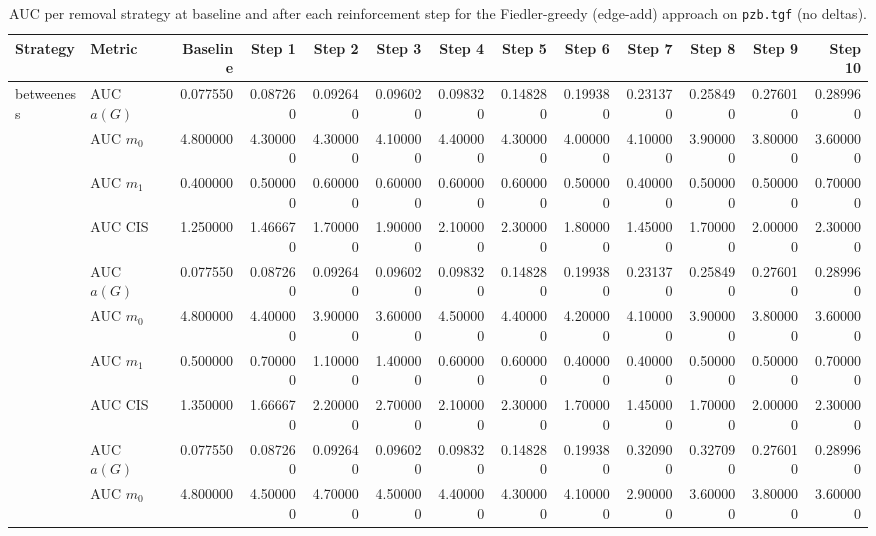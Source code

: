 \begin{table}[htbp]
  \centering
  \caption{AUC per removal strategy at baseline and after each reinforcement step for the Fiedler-greedy (edge-add) approach on \texttt{pzb.tgf} (no deltas).}
  \label{tab:pzb-fiedler_greedy-auc}
\setlength{\tabcolsep}{2.5pt}
  \begin{tabular}{llrrrrrrrrrrr}
    \toprule
    \textbf{Strategy} & \textbf{Metric} & \textbf{Baseline} & \textbf{Step 1} & \textbf{Step 2} & \textbf{Step 3} & \textbf{Step 4} & \textbf{Step 5} & \textbf{Step 6} & \textbf{Step 7} & \textbf{Step 8} & \textbf{Step 9} & \textbf{Step 10} \\
    \midrule
    \multirow{4}{*}{betweeness} & AUC $a(G)$ & 0.077550 & 0.087260 & 0.092640 & 0.096020 & 0.098320 & 0.148280 & 0.199380 & 0.231370 & 0.258490 & 0.276010 & 0.289960 \\
    & AUC $m_0$ & 4.800000 & 4.300000 & 4.300000 & 4.100000 & 4.400000 & 4.300000 & 4.000000 & 4.100000 & 3.900000 & 3.800000 & 3.600000 \\
    & AUC $m_1$ & 0.400000 & 0.500000 & 0.600000 & 0.600000 & 0.600000 & 0.600000 & 0.500000 & 0.400000 & 0.500000 & 0.500000 & 0.700000 \\
    & AUC CIS & 1.250000 & 1.466670 & 1.700000 & 1.900000 & 2.100000 & 2.300000 & 1.800000 & 1.450000 & 1.700000 & 2.000000 & 2.300000 \\
    \addlinespace
    \multirow{4}{*}{closeness} & AUC $a(G)$ & 0.077550 & 0.087260 & 0.092640 & 0.096020 & 0.098320 & 0.148280 & 0.199380 & 0.231370 & 0.258490 & 0.276010 & 0.289960 \\
    & AUC $m_0$ & 4.800000 & 4.400000 & 3.900000 & 3.600000 & 4.500000 & 4.400000 & 4.200000 & 4.100000 & 3.900000 & 3.800000 & 3.600000 \\
    & AUC $m_1$ & 0.500000 & 0.700000 & 1.100000 & 1.400000 & 0.600000 & 0.600000 & 0.400000 & 0.400000 & 0.500000 & 0.500000 & 0.700000 \\
    & AUC CIS & 1.350000 & 1.666670 & 2.200000 & 2.700000 & 2.100000 & 2.300000 & 1.700000 & 1.450000 & 1.700000 & 2.000000 & 2.300000 \\
    \addlinespace
    \multirow{4}{*}{core influence} & AUC $a(G)$ & 0.077550 & 0.087260 & 0.092640 & 0.096020 & 0.098320 & 0.148280 & 0.199380 & 0.320900 & 0.327090 & 0.276010 & 0.289960 \\
    & AUC $m_0$ & 4.800000 & 4.500000 & 4.700000 & 4.500000 & 4.400000 & 4.300000 & 4.100000 & 2.900000 & 3.600000 & 3.800000 & 3.600000 \\

\end{tabular}
\end{table}
